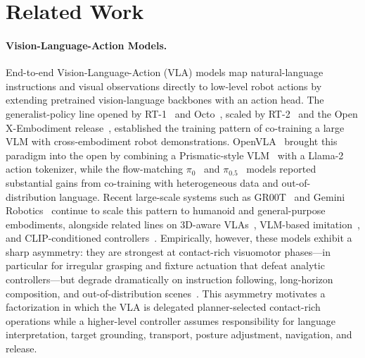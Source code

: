 \documentclass{article}
\begin{document}
\section{Related Work}
\label{sec:related}

	\paragraph{Vision-Language-Action Models.} End-to-end Vision-Language-Action (VLA) models map natural-language instructions and visual observations directly to low-level robot actions by extending pretrained vision-language backbones with an action head. The generalist-policy line opened by RT-1~\citep{brohan2022rt} and Octo~\citep{octo_2023}, scaled by RT-2~\citep{brohan2023rt2} and the Open X-Embodiment release~\citep{open_x_embodiment_rt_x_2023}, established the training pattern of co-training a large VLM with cross-embodiment robot demonstrations. OpenVLA~\citep{kim2024openvla} brought this paradigm into the open by combining a Prismatic-style VLM~\citep{karamcheti2024prismatic} with a Llama-2 action tokenizer, while the flow-matching $\pi_0$~\citep{black2025pi0} and $\pi_{0.5}$~\citep{black2025pi05} models reported substantial gains from co-training with heterogeneous data and out-of-distribution language. Recent large-scale systems such as GR00T~\citep{bjorck2025gr00t} and Gemini Robotics~\citep{team2025gemini} continue to scale this pattern to humanoid and general-purpose embodiments, alongside related lines on 3D-aware VLAs~\citep{zhen20243dvla, driess2023palme}, VLM-based imitation~\citep{li2024roboflamingo, huang2023embodied}, and CLIP-conditioned controllers~\citep{shridhar2022cliport, chi2023diffusion, zhao2023act}. Empirically, however, these models exhibit a sharp asymmetry: they are strongest at contact-rich visuomotor phases---in particular for irregular grasping and fixture actuation that defeat analytic controllers---but degrade dramatically on instruction following, long-horizon composition, and out-of-distribution scenes~\citep{kim2024openvla, black2025pi05, pi0-experiment-wild}. This asymmetry motivates a factorization in which the VLA is delegated planner-selected contact-rich operations while a higher-level controller assumes responsibility for language interpretation, target grounding, transport, posture adjustment, navigation, and release.
\end{document}

